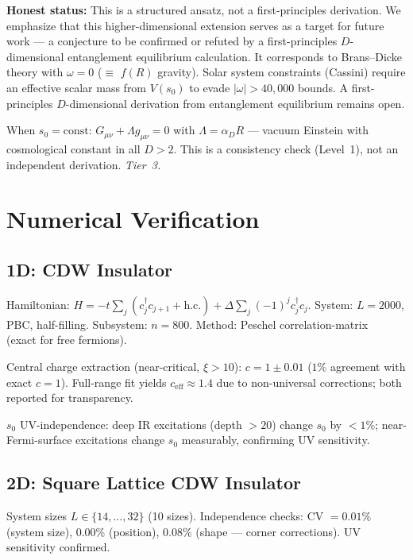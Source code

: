 \documentclass[aps,prd,twocolumn,superscriptaddress,nofootinbib,floatfix]{revtex4-2}
\newcommand{\sn}{s_0}
\newcommand{\aD}{\alpha_D}
\begin{document}
\textbf{Honest status:} This is a structured ansatz, not a first-principles derivation. We emphasize that this higher-dimensional extension serves as a target for future work --- a conjecture to be confirmed or refuted by a first-principles $D$-dimensional entanglement equilibrium calculation. It corresponds to Brans--Dicke theory with $\omega = 0$ ($\equiv$ $f(R)$ gravity). Solar system constraints (Cassini) require an effective scalar mass from $V(\sn)$ to evade $|\omega| > 40{,}000$ bounds. A first-principles $D$-dimensional derivation from entanglement equilibrium remains open.

When $\sn = \text{const}$: $G_{\mu\nu} + \Lambda g_{\mu\nu} = 0$ with $\Lambda = \aD R$ --- vacuum Einstein with cosmological constant in all $D > 2$. This is a consistency check (Level~1), not an independent derivation. \emph{Tier~3.}

\section{Numerical Verification}
\label{sec:numerics}

\subsection{1D: CDW Insulator}

Hamiltonian: $H = -t\sum_j(c_j^\dagger c_{j+1} + \text{h.c.}) + \Delta\sum_j(-1)^j c_j^\dagger c_j$. System: $L = 2000$, PBC, half-filling. Subsystem: $n = 800$. Method: Peschel correlation-matrix~\cite{Peschel2003} (exact for free fermions).

Central charge extraction (near-critical, $\xi > 10$): $c = 1 \pm 0.01$ ($1\%$ agreement with exact $c = 1$). Full-range fit yields $c_{\mathrm{eff}} \approx 1.4$ due to non-universal corrections; both reported for transparency.

$\sn$ UV-independence: deep IR excitations (depth $> 20$) change $\sn$ by $< 1\%$; near-Fermi-surface excitations change $\sn$ measurably, confirming UV sensitivity.

\subsection{2D: Square Lattice CDW Insulator}

System sizes $L \in \{14, \ldots, 32\}$ (10 sizes). Independence checks: CV $= 0.01\%$ (system size), $0.00\%$ (position), $0.08\%$ (shape --- corner corrections). UV sensitivity confirmed.
\end{document}
